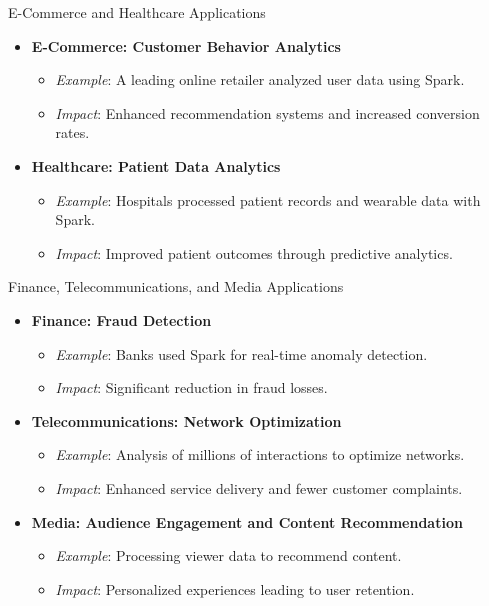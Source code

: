 \documentclass[aspectratio=169]{beamer}
\begin{document}
\begin{frame}[fragile]{E-Commerce and Healthcare Applications}
    \begin{itemize}
        \item \textbf{E-Commerce: Customer Behavior Analytics}
            \begin{itemize}
                \item \textit{Example}: A leading online retailer analyzed user data using Spark.
                \item \textit{Impact}: Enhanced recommendation systems and increased conversion rates.
            \end{itemize}
        
        \item \textbf{Healthcare: Patient Data Analytics}
            \begin{itemize}
                \item \textit{Example}: Hospitals processed patient records and wearable data with Spark.
                \item \textit{Impact}: Improved patient outcomes through predictive analytics.
            \end{itemize}
    \end{itemize}
\end{frame}

\begin{frame}[fragile]{Finance, Telecommunications, and Media Applications}
    \begin{itemize}
        \item \textbf{Finance: Fraud Detection}
            \begin{itemize}
                \item \textit{Example}: Banks used Spark for real-time anomaly detection.
                \item \textit{Impact}: Significant reduction in fraud losses.
            \end{itemize}

        \item \textbf{Telecommunications: Network Optimization}
            \begin{itemize}
                \item \textit{Example}: Analysis of millions of interactions to optimize networks.
                \item \textit{Impact}: Enhanced service delivery and fewer customer complaints.
            \end{itemize}
            
        \item \textbf{Media: Audience Engagement and Content Recommendation}
            \begin{itemize}
                \item \textit{Example}: Processing viewer data to recommend content.
                \item \textit{Impact}: Personalized experiences leading to user retention.
            \end{itemize}
    \end{itemize}
\end{frame}
\end{document}
